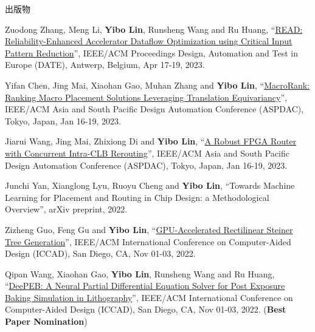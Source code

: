 \begin{rSection}{出版物}
\begin{description}[font=\normalfont, rightmargin=2em]
\item[{[C73]}]{
        Zuodong Zhang, Meng Li, \textbf{Yibo Lin}, Runsheng Wang and Ru Huang, 
    ``\href{https://doi.org/10.23919/DATE56975.2023.10137254}{READ: Reliability-Enhanced Accelerator Dataflow Optimization using Critical Input Pattern Reduction}'', 
    IEEE/ACM Proceedings Design, Automation and Test in Europe (DATE), Antwerp, Belgium, Apr 17-19, 2023.
    
}
            

\item[{[C72]}]{
        Yifan Chen, Jing Mai, Xiaohan Gao, Muhan Zhang and \textbf{Yibo Lin}, 
    ``\href{https://doi.org/10.1145/3566097.3567899}{MacroRank: Ranking Macro Placement Solutions Leveraging Translation Equivariancy}'', 
    IEEE/ACM Asia and South Pacific Design Automation Conference (ASPDAC), Tokyo, Japan, Jan 16-19, 2023.
    
}
            

\item[{[C71]}]{
        Jiarui Wang, Jing Mai, Zhixiong Di and \textbf{Yibo Lin}, 
    ``\href{https://doi.org/10.1145/3566097.3567898}{A Robust FPGA Router with Concurrent Intra-CLB Rerouting}'', 
    IEEE/ACM Asia and South Pacific Design Automation Conference (ASPDAC), Tokyo, Japan, Jan 16-19, 2023.
    
}
            

\item[{[C70]}]{
        Junchi Yan, Xianglong Lyu, Ruoyu Cheng and \textbf{Yibo Lin}, 
    ``Towards Machine Learning for Placement and Routing in Chip Design: a Methodological Overview'', 
    arXiv preprint, 2022.
    
}
            

\item[{[C69]}]{
        Zizheng Guo, Feng Gu and \textbf{Yibo Lin}, 
    ``\href{https://doi.org/10.1145/3508352.3549434}{GPU-Accelerated Rectilinear Steiner Tree Generation}'', 
    IEEE/ACM International Conference on Computer-Aided Design (ICCAD), San Diego, CA, Nov 01-03, 2022.
    
}
            

\item[{[C68]}]{
        Qipan Wang, Xiaohan Gao, \textbf{Yibo Lin}, Runsheng Wang and Ru Huang, 
    ``\href{https://doi.org/10.1145/3508352.3549398}{DeePEB: A Neural Partial Differential Equation Solver for Post Exposure Baking Simulation in Lithography}'', 
    IEEE/ACM International Conference on Computer-Aided Design (ICCAD), San Diego, CA, Nov 01-03, 2022.
    (\textbf{Best Paper Nomination})
}
            


\end{description}
\end{rSection}
